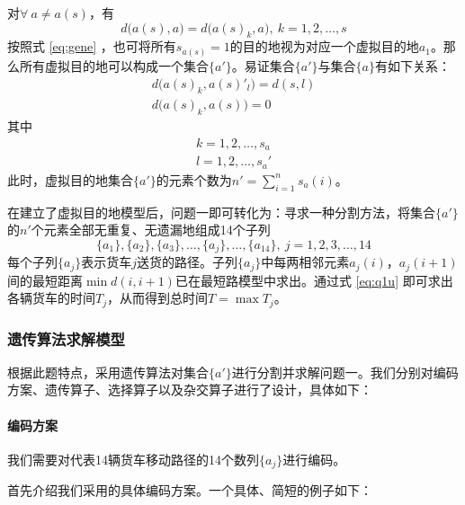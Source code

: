 \documentclass[UTF8,cs4size]{ctexart}
\begin{document}
对$\forall\ a \neq a(s)$，有
\begin{equation}
  d\big(a(s), a\big) = d\big(a(s)_k, a\big),\ k = 1,2,\ldots,s \label{eq:gene}
\end{equation}
按照式 \ref{eq:gene} ，也可将所有$s_{a(s)}= 1$的目的地视为对应一个虚拟目的地$a_1$。那么所有虚拟目的地可以构成一个集合$\{a'\}$。易证集合$\{a'\}$与集合$\{a\}$有如下关系：
\begin{gather*}
  d\big(a(s)_k, a(s)'_l\big) = d(s,l) \\
  d\big(a(s)_k, a(s)\big) = 0
\end{gather*}
其中
\begin{gather*}
  k = 1, 2,\ldots,s_a \\
  l = 1, 2,\ldots,s_a'
\end{gather*}
此时，虚拟目的地集合$\{a'\}$的元素个数为$n'=\sum_{i=1}^n s_a(i)$。

在建立了虚拟目的地模型后，问题一即可转化为：寻求一种分割方法，将集合$\{a'\}$的$n'$个元素全部无重复、无遗漏地组成14个子列
\begin{equation*}
  \{a_1\},\{a_2\},\{a_3\},\ldots,\{a_j\},\ldots,\{a_{14}\},\ j = 1,2,3,\ldots,14
\end{equation*}
每个子列$\{a_j\}$表示货车$j$送货的路径。子列$\{a_j\}$中每两相邻元素$a_{j}(i)$，$a_{j}(i+1)$间的最短距离$\min d(i,i+1)$已在最短路模型中求出。通过式 \ref{eq:q1u} 即可求出各辆货车的时间$T_j$，从而得到总时间$T=\max T_j$。
\subsubsection{遗传算法求解模型}
根据此题特点，采用遗传算法对集合$\{a'\}$进行分割并求解问题一。我们分别对编码方案、遗传算子、选择算子以及杂交算子进行了设计，具体如下：
\paragraph{编码方案}
我们需要对代表14辆货车移动路径的14个数列$\{a_j\}$进行编码。

首先介绍我们采用的具体编码方案。一个具体、简短的例子如下：
\end{document}

